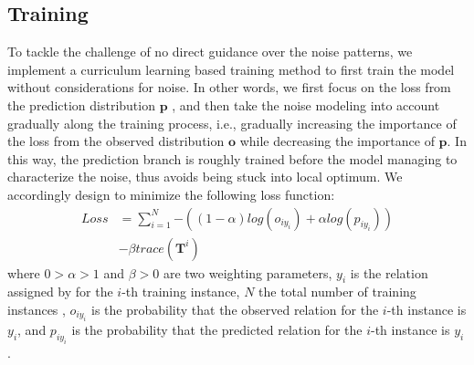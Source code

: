 \subsection{Training}
To tackle the challenge of no direct guidance over the noise patterns,
we implement a curriculum learning based training method to
first train the model without considerations for noise. In other words, we first focus on the loss from the prediction distribution $\mathbf{p}$ ,  and then take the noise modeling into account gradually along the training process, i.e., gradually increasing the importance of the loss from the observed distribution $\mathbf{o}$ while decreasing the importance of $\mathbf{p}$. In this way, the prediction branch is roughly trained before the model managing to characterize the noise, thus avoids being stuck into local optimum.
We accordingly design to minimize  the following loss function:
%
%
\begin{equation}
\begin{aligned}
Loss	&=\sum_{i=1}^N{-((1-\alpha) log(o_{iy_{i}}) + \alpha log(p_{iy_{i}}))} \\
&- \beta trace(\mathbf{T}^{i})
\end{aligned}
\label{general_loss}
\end{equation}
where $0>\alpha>1$ and $\beta>0$ are two weighting parameters, $y_i$ is the relation assigned by \DS for the $i$-th training instance, $N$ the total number of training instances , $o_{iy_{i}}$ is the probability that the observed relation for the $i$-th instance is $y_i$, and $p_{iy_{i}}$ is the probability that the predicted relation for the $i$-th instance is $y_i$.

